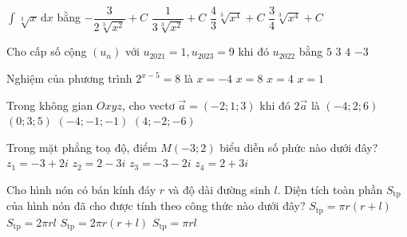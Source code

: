 \begin{ex}%
	$\displaystyle\int\limits\sqrt[3]{x}\mathrm{\,d}x$ bằng
	\choice
	{$-\dfrac{3}{2\sqrt[3]{x^2}}+C$}
	{$\dfrac{1}{3\sqrt[3]{x^2}}+C$}
	{$\dfrac{4}{3}\sqrt[3]{x^4}+C$}
	{\True $\dfrac{3}{4}\sqrt[3]{x^4}+C$}
\end{ex}
\begin{ex}%
	Cho cấp số cộng $(u_n)$ với $u_{2021}=1,u_{2023}=9$ khi đó  $u_{2022}$ bằng
	\choice
	{\True$5$}
	{$3$}
	{$4$}
	{$-3$}
\end{ex}
\begin{ex}%
	Nghiệm của phương trình $2^{x-5}=8$ là
	\choice
	{$x=-4$}
	{\True$x=8$}
	{$x=4$}
	{$x=1$}
\end{ex}
\begin{ex}%
	Trong không gian $Oxyz$, cho vectơ $\overrightarrow{a}=(-2;1;3)$ khi đó $2\overrightarrow{a}$ là
	\choice
	{\True $(-4;2;6)$}
	{$(0;3;5)$}
	{$(-4;-1;-1)$}
	{$(4;-2;-6)$}
\end{ex}


\begin{ex}%
	Trong mặt phẳng toạ độ, điểm $M(-3 ; 2)$ biểu diễn số phức nào dưới đây?
	\choice 
	{\True $z_1=-3+2i$}
	{$z_2=2-3i$}
	{$z_3=-3-2i$}
	{$z_4=2+3i$}
\end{ex}



\begin{ex}%
	Cho hình nón có bán kính đáy $r$ và độ dài đường sinh $l$. Diện tích toàn phần $S_{\text{tp}}$ của hình nón đã cho được tính theo công thức nào dưới đây?
	\choice 
	{\True $S_{\text{tp}}=\pi r(r+l)$}
	{$S_{\text{tp}}=2 \pi r l$}
	{$S_{\text{tp}}=2 \pi r(r+l)$}
	{$S_{\text{tp}}=\pi rl$}
\end{ex}


